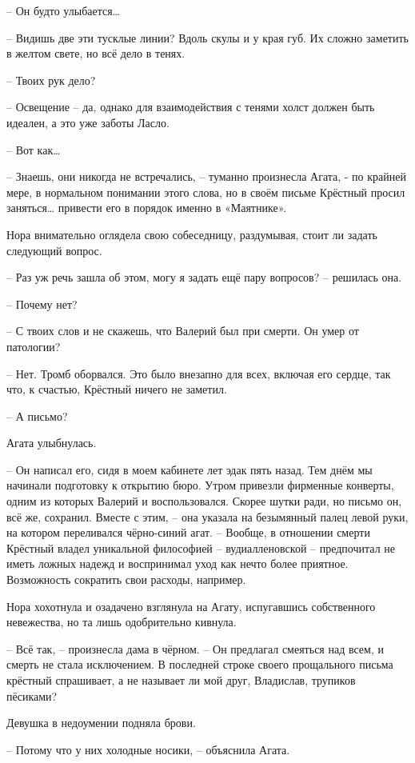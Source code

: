 \documentclass[
  a5paperpaper,
  DIV=11,
  numbers=noendperiod]{scrreprt}
\begin{document}
-- Он будто улыбается\ldots{}

-- Видишь две эти тусклые линии? Вдоль скулы и у края губ. Их сложно
заметить в желтом свете, но всё дело в тенях.

-- Твоих рук дело?

-- Освещение -- да, однако для взаимодействия с тенями холст должен быть
идеален, а это уже заботы Ласло.

-- Вот как\ldots{}

-- Знаешь, они никогда не встречались, -- туманно произнесла Агата, - по
крайней мере, в нормальном понимании этого слова, но в своём письме
Крёстный просил заняться\ldots{} привести его в порядок именно в
«Маятнике».

Нора внимательно оглядела свою собеседницу, раздумывая, стоит ли задать
следующий вопрос.

-- Раз уж речь зашла об этом, могу я задать ещё пару вопросов? --
решилась она.

-- Почему нет?

-- С твоих слов и не скажешь, что Валерий был при смерти. Он умер от
патологии?

-- Нет. Тромб оборвался. Это было внезапно для всех, включая его сердце,
так что, к счастью, Крёстный ничего не заметил.

-- А письмо?

Агата улыбнулась.

-- Он написал его, сидя в моем кабинете лет эдак пять назад. Тем днём мы
начинали подготовку к открытию бюро. Утром привезли фирменные конверты,
одним из которых Валерий и воспользовался. Скорее шутки ради, но письмо
он, всё же, сохранил. Вместе с этим, -- она указала на безымянный палец
левой руки, на котором переливался чёрно-синий агат. -- Вообще, в
отношении смерти Крёстный владел уникальной философией --
вудиалленовской -- предпочитал не иметь ложных надежд и воспринимал уход
как нечто более приятное. Возможность сократить свои расходы, например.

Нора хохотнула и озадачено взглянула на Агату, испугавшись собственного
невежества, но та лишь одобрительно кивнула.

-- Всё так, -- произнесла дама в чёрном. -- Он предлагал смеяться над
всем, и смерть не стала исключением. В последней строке своего
прощального письма крёстный спрашивает, а не называет ли мой друг,
Владислав, трупиков пёсиками?

Девушка в недоумении подняла брови.

-- Потому что у них холодные носики, -- объяснила Агата.
\end{document}

